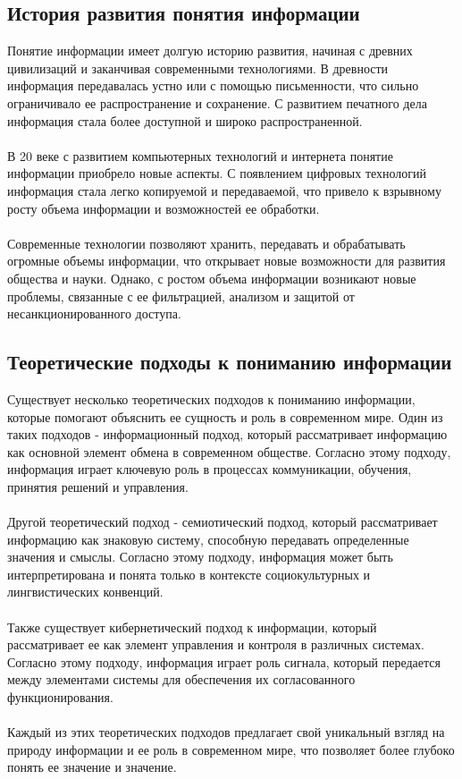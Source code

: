 \documentclass{article}
\begin{document}
\subsection{История развития понятия информации}
Понятие информации имеет долгую историю развития, начиная с древних цивилизаций и заканчивая современными технологиями. В древности информация передавалась устно или с помощью письменности, что сильно ограничивало ее распространение и сохранение. С развитием печатного дела информация стала более доступной и широко распространенной.\\
~\\
В 20 веке с развитием компьютерных технологий и интернета понятие информации приобрело новые аспекты. С появлением цифровых технологий информация стала легко копируемой и передаваемой, что привело к взрывному росту объема информации и возможностей ее обработки.\\
~\\
Современные технологии позволяют хранить, передавать и обрабатывать огромные объемы информации, что открывает новые возможности для развития общества и науки. Однако, с ростом объема информации возникают новые проблемы, связанные с ее фильтрацией, анализом и защитой от несанкционированного доступа.
\subsection{Теоретические подходы к пониманию информации}
Существует несколько теоретических подходов к пониманию информации, которые помогают объяснить ее сущность и роль в современном мире. Один из таких подходов - информационный подход, который рассматривает информацию как основной элемент обмена в современном обществе. Согласно этому подходу, информация играет ключевую роль в процессах коммуникации, обучения, принятия решений и управления.\\
~\\
Другой теоретический подход - семиотический подход, который рассматривает информацию как знаковую систему, способную передавать определенные значения и смыслы. Согласно этому подходу, информация может быть интерпретирована и понята только в контексте социокультурных и лингвистических конвенций.\\
~\\
Также существует кибернетический подход к информации, который рассматривает ее как элемент управления и контроля в различных системах. Согласно этому подходу, информация играет роль сигнала, который передается между элементами системы для обеспечения их согласованного функционирования.\\
~\\
Каждый из этих теоретических подходов предлагает свой уникальный взгляд на природу информации и ее роль в современном мире, что позволяет более глубоко понять ее значение и значение.
\end{document}
